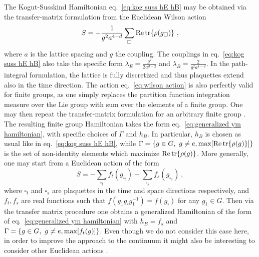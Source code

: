 The Kogut-Susskind Hamiltonian eq.~\eqref{eq:kog suss hE hB} may be obtained via the transfer-matrix formulation from the Euclidean Wilson action \cite{CreutzTransferMatrix,KogRev}
\begin{equation}
    \label{eq:wilson action}
    S = -\frac{1}{g^2 a^{4-d}} \sum_{\square} \Re \tr{\rho(g_\square)} \ ,
\end{equation}
where $a$ is the lattice spacing and $g$ the coupling.
The couplings in  eq.~\eqref{eq:kog suss hE hB} also take the specific form $\lambda_E = \frac{g^2}{2a^{d-2}}$ and $\lambda_B = \frac{2}{g^2 a^{4-d}}$.
In the path-integral formulation, the lattice is fully discretized and thus plaquettes extend also in the time direction.
The action eq.~\eqref{eq:wilson action} is also perfectly valid for finite groups, as one simply replaces the partition function integration measure over the Lie group with sum over the elements of a finite group.
One may then repeat the transfer-matrix formulation for an arbitrary finite group \cite{TransferMatrixFiniteGroup}.
The resulting finite group Hamiltonian takes the form eq.~\eqref{eq:generalized ym hamiltonian}, with specific choices of $\Gamma$ and $h_B$.
In particular, $h_B$ is chosen as usual like in eq.~\eqref{eq:kog suss hE hB}, while $\Gamma = \{g \in G,\,\, g \neq e, \mathrm{max} \bqty{\Re \tr{\rho(g)}}  \}$ is the set of non-identity elements which maximize $\Re \tr{\rho(g)}$.
More generally, one may start from a Euclidean action of the form
\begin{equation}
    \label{eq:anisotropic action}
    S = -\sum_{\square_t} f_t(g_{\square_t}) - \sum_{\square_s} f_s(g_{\square_s}) \ ,
\end{equation}
where $\square_t$ and $\square_s$ are plaquettes in the time and space directions respectively, and $f_t, f_s$ are real functions such that $f(g_1 g_\square g_1^{-1})=f(g_\square)$ for any $g_1 \in G$.
Then via the transfer matrix procedure one obtains a generalized Hamiltonian of the form of eq.~\eqref{eq:generalized ym hamiltonian} with $h_B = f_s$ and $\Gamma = \{g \in G,\,\, g \neq e, \mathrm{max} \bqty{f_t(g)} \}$.
Even though we do not consider this case here, in order to improve the approach to the continuum it might also be interesting to consider other Euclidean actions \cite{Hasenfratz1,LammChairs}.

